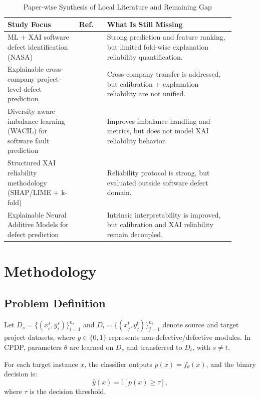\documentclass[conference]{IEEEtran}
\begin{document}
\begin{table}[t]
\caption{Paper-wise Synthesis of Local Literature and Remaining Gap}
\label{tab:related_gap}
\centering
\footnotesize
\setlength{\tabcolsep}{3.8pt}
\renewcommand{\arraystretch}{1.10}
\begin{tabular}{|>{\raggedright\arraybackslash}p{0.29\linewidth}|>{\centering\arraybackslash}p{0.11\linewidth}|>{\raggedright\arraybackslash}p{0.50\linewidth}|}
\hline
\textbf{Study Focus} & \textbf{Ref.} & \textbf{What Is Still Missing} \\
\hline
ML + XAI software defect identification (NASA) & \cite{r1,r2} & Strong prediction and feature ranking, but limited fold-wise explanation reliability quantification. \\
\hline
Explainable cross-company project-level defect prediction & \cite{r3} & Cross-company transfer is addressed, but calibration + explanation reliability are not unified. \\
\hline
Diversity-aware imbalance learning (WACIL) for software fault prediction & \cite{r4} & Improves imbalance handling and metrics, but does not model XAI reliability behavior. \\
\hline
Structured XAI reliability methodology (SHAP/LIME + k-fold) & \cite{r5} & Reliability protocol is strong, but evaluated outside software defect domain. \\
\hline
Explainable Neural Additive Models for defect prediction & \cite{r6} & Intrinsic interpretability is improved, but calibration and XAI reliability remain decoupled. \\
\hline
\end{tabular}
\renewcommand{\arraystretch}{1.0}
\normalsize
\end{table}

\section{Methodology}
\subsection{Problem Definition}
Let \(D_s=\{(x_i^s,y_i^s)\}_{i=1}^{n_s}\) and \(D_t=\{(x_j^t,y_j^t)\}_{j=1}^{n_t}\) denote source and target project datasets, where \(y\in\{0,1\}\) represents non-defective/defective modules. In CPDP, parameters \(\theta\) are learned on \(D_s\) and transferred to \(D_t\), with \(s\neq t\).

For each target instance \(x\), the classifier outputs \(p(x)=f_\theta(x)\), and the binary decision is:
\begin{equation}
\hat{y}(x)=\mathbb{I}[p(x)\ge \tau],
\label{eq:hard_pred}
\end{equation}
where \(\tau\) is the decision threshold.
\end{document}
